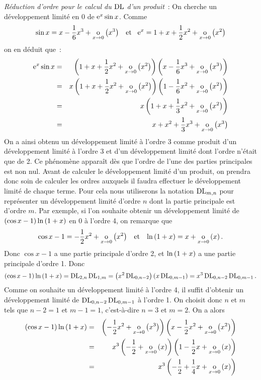 \documentclass{magnoliaold}
\begin{document}
\begin{remarques}
  \remarque \textit{Réduction d'ordre pour le calcul du $\operatorname{DL}$ d'un produit}~: 
    On cherche un développement limité en 0 de ${\rm e}^x\sin x$. Comme
    \[\sin x=x-\frac{1}{6}x^3+\underset{x \rightarrow 0}{\text{o}}\left(x^3\right) \quad\!\text{et}\quad\!
      {\rm e}^x=1+x+\frac{1}{2}x^2+\underset{x \rightarrow 0}{\text{o}}\left(x^2\right)\]
    on en déduit que~:
    \begin{eqnarray*}
    {\rm e}^x\sin x
    &=& \left(1+x+\frac{1}{2}x^2+\underset{x \rightarrow 0}{\text{o}}\left(x^2\right)\right)
        \left(x-\frac{1}{6}x^3+\underset{x \rightarrow 0}{\text{o}}\left(x^3\right)\right)\\
    &=& x\left(1+x+\frac{1}{2}x^2+\underset{x \rightarrow 0}{\text{o}}\left(x^2\right)\right)
         \left(1-\frac{1}{6}x^2+\underset{x \rightarrow 0}{\text{o}}\left(x^2\right)\right)\\
    &=& x\left(1+x+\frac{1}{3}x^2+\underset{x \rightarrow 0}{\text{o}}\left(x^2\right)\right)\\
    &=& x+x^2+\frac{1}{3}x^3+\underset{x \rightarrow 0}{\text{o}}\left(x^3\right)
    \end{eqnarray*}
    On a ainsi obtenu un développement limité à l'ordre 3 comme produit d'un
    développement limité à l'ordre 3 et d'un développement limité dont l'ordre
    n'était que de 2.
    Ce phénomène apparaît dès que l'ordre de l'une des parties principales est
    non nul. Avant de calculer le développement limité d'un produit, on prendra
    donc soin de calculer les ordres auxquels il faudra effectuer le développement
    limité de chaque terme. Pour cela  nous utiliserons la notation $\operatorname{DL}_{m,n}$
    pour représenter un développement limité d'ordre $n$ dont la partie
    principale est d'ordre $m$. Par exemple, si l'on souhaite obtenir
    un développement limité de $\left(\cos x-1\right)\ln\left(1+x\right)$ en 0 à l'ordre 4, on
    remarque que
    \[\cos x-1=-\frac{1}{2}x^2+\underset{x \rightarrow 0}{\text{o}}\left(x^2\right) \quad\!\text{et}\quad\!
      \ln\left(1+x\right)=x+\underset{x \rightarrow 0}{\text{o}}\left(x\right).\]
    Donc $\cos x-1$ a une partie principale d'ordre 2, et $\ln\left(1+x\right)$ a une
    partie principale d'ordre 1. Donc
    \[\left(\cos x-1\right)\ln\left(1+x\right)=\operatorname{DL}_{2,n}\operatorname{DL}_{1,m}=\left(x^2\operatorname{DL}_{0,n-2}\right)\left(x\operatorname{DL}_{0,m-1}\right)=
      x^3 \operatorname{DL}_{0,n-2}\operatorname{DL}_{0,m-1}.\]
    Comme on souhaite un développement limité à l'ordre 4, il suffit d'obtenir un
    développement limité de $\operatorname{DL}_{0,n-2}\operatorname{DL}_{0,m-1}$ à l'ordre 1. On choisit donc
    $n$ et $m$ tels que $n-2=1$ et $m-1=1$, c'est-à-dire $n=3$ et $m=2$. On a alors
    \begin{eqnarray*}
    \p{\cos x-1}\ln\p{1+x}
    &=& \p{-\frac{1}{2}x^2+\petitozero{x}{x^3}}
        \p{x-\frac{1}{2}x^2+\petitozero{x}{x^2}}\\
    &=& x^3\p{-\frac{1}{2}+\petitozero{x}{x}}\p{1-\frac{1}{2}x+\petitozero{x}{x}}\\
    &=& x^3\p{-\frac{1}{2}+\frac{1}{4}x+\petitozero{x}{x}}\\

\end{eqnarray*}
\end{remarques}
\end{document}

